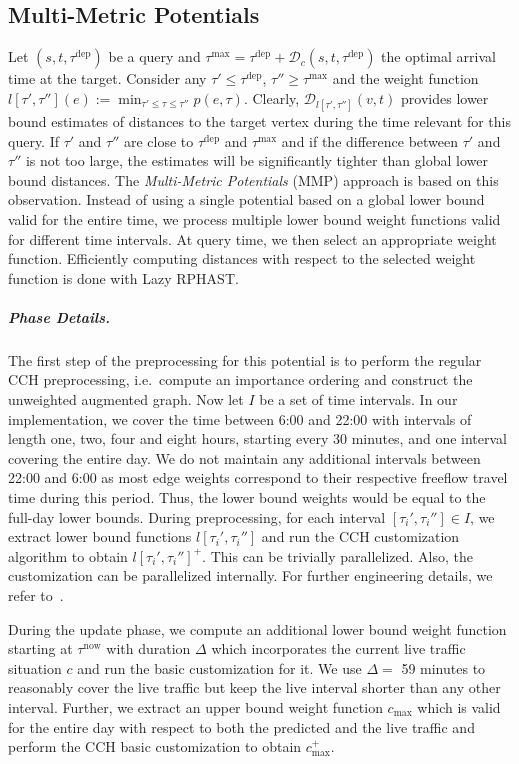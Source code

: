 \documentclass[a4paper,UKenglish,cleveref, autoref, thm-restate,anonymous]{lipics-v2021}
\newcommand*{\pred}{p}
\newcommand*{\comb}{c}
\newcommand*{\dist}{\mathcal{D}}
\newcommand*{\tdep}{\tau^{\operatorname{dep}}}
\newcommand*{\tnow}{\tau^{\operatorname{now}}}
\newcommand*{\tmax}{\tau^{\max}}
\begin{document}
\subsection{Multi-Metric Potentials}

Let $(s,t,\tdep)$ be a query and $\tmax = \tdep + \dist_c(s,t,\tdep)$ the optimal arrival time at the target.
Consider any $\tau' \leq \tdep$, $\tau'' \geq \tmax$ and the weight function $l[\tau', \tau''](e) := \min_{\tau' \leq \tau \leq \tau''}\pred(e, \tau)$. %
Clearly, $\dist_{l[\tau', \tau'']}(v,t)$ provides lower bound estimates of distances to the target vertex during the time relevant for this query.
If $\tau'$ and $\tau''$ are close to $\tdep$ and $\tmax$ and if the difference between $\tau'$ and $\tau''$ is not too large, the estimates will be significantly tighter than global lower bound distances.
The \emph{Multi-Metric Potentials} (MMP) approach is based on this observation.
Instead of using a single potential based on a global lower bound valid for the entire time, we process multiple lower bound weight functions valid for different time intervals.
At query time, we then select an appropriate weight function.
Efficiently computing distances with respect to the selected weight function is done with Lazy RPHAST.

\subparagraph{Phase Details.}
The first step of the preprocessing for this potential is to perform the regular CCH preprocessing, i.e.\ compute an importance ordering and construct the unweighted augmented graph.
Now let $I$ be a set of time intervals.
In our implementation,
we cover the time between 6:00 and 22:00 with intervals of length one, two, four and eight hours, starting every 30 minutes,
and one interval covering the entire day.
We do not maintain any additional intervals between 22:00 and 6:00 as most edge weights correspond to their respective freeflow travel time during this period.
Thus, the lower bound weights would be equal to the full-day lower bounds.
During preprocessing, for each interval $[\tau_i', \tau_i''] \in I$, we extract lower bound functions $l[\tau_i', \tau_i'']$ and run the CCH customization algorithm to obtain $l[\tau_i', \tau_i'']^+$.
This can be trivially parallelized.
Also, the customization can be parallelized internally.
For further engineering details, we refer to~\cite{dsw-cch-15,bsw-rttau-19,ghuw-fbndocch-19}.

During the update phase, we compute an additional lower bound weight function starting at $\tnow$ with duration $\Delta$ which incorporates the current live traffic situation $\comb$ and run the basic customization for it.
We use $\Delta =$ 59 minutes to reasonably cover the live traffic but keep the live interval shorter than any other interval.
Further, we extract an upper bound weight function $\comb_{\max}$ which is valid for the entire day with respect to both the predicted and the live traffic and perform the CCH basic customization to obtain $\comb^+_{\max}$.
\end{document}
